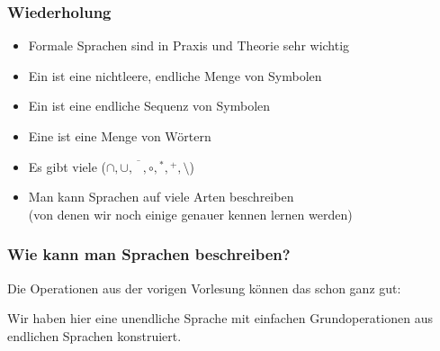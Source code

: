 \documentclass[aspectratio=1610,onlymath]{beamer}
\begin{document}
\maketitle


\begin{frame}\frametitle{Wiederholung}

\begin{itemize}
\item Formale Sprachen sind in Praxis und Theorie sehr wichtig
\item Ein  ist eine nichtleere, endliche Menge von Symbolen
\item Ein  ist eine endliche Sequenz von Symbolen
\item Eine  ist eine Menge von Wörtern
\item Es gibt viele  ($\cap, \cup, \overline{\phantom{L}}, \circ, {}^*, {}^+, \setminus$)
\item Man kann Sprachen auf viele Arten beschreiben\\
(von denen wir noch einige genauer kennen lernen werden)
\end{itemize}

\end{frame}


\begin{frame}\frametitle{Wie kann man Sprachen beschreiben?}

Die Operationen aus der vorigen Vorlesung können das schon ganz gut:
\medskip

\bigskip

Wir haben hier eine unendliche Sprache mit einfachen Grundoperationen aus endlichen Sprachen konstruiert.
\bigskip


\end{frame}
\end{document}
